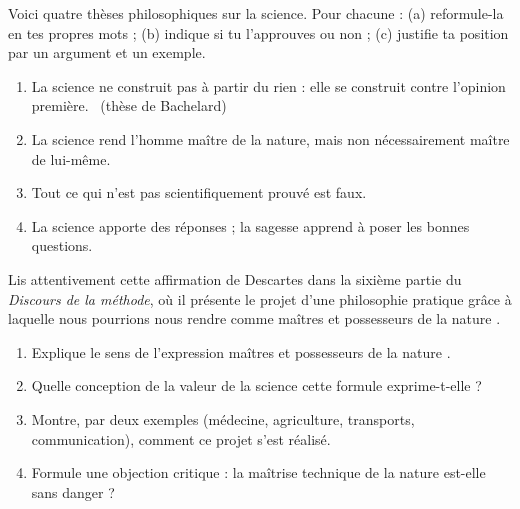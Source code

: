 \documentclass[11pt]{article}
\newcounter{popsec}
\newcounter{popsub}
\newcommand{\courssub}[1]{%
  \stepcounter{popsub}%
  \par\vspace{9pt}\noindent{\popxbold\fontsize{11.5}{13}\selectfont\color{popink}{\color{poporange}\thepopsec.\thepopsub}\hspace{6pt}#1}\par\nopagebreak\vspace{4pt}
}
\begin{document}
\courssub{Je m'entraîne}

\begin{exercice}
Voici quatre thèses philosophiques sur la science. Pour chacune : (a) reformule-la en tes propres mots ; (b) indique si tu l'approuves ou non ; (c) justifie ta position par un argument et un exemple.

\begin{enumerate}
\item \guillemotleft La science ne construit pas à partir du rien : elle se construit contre l'opinion première. \guillemotright\ (thèse de Bachelard)
\item La science rend l'homme maître de la nature, mais non nécessairement maître de lui-même.
\item Tout ce qui n'est pas scientifiquement prouvé est faux.
\item La science apporte des réponses ; la sagesse apprend à poser les bonnes questions.
\end{enumerate}
\end{exercice}

\begin{exercice}
Lis attentivement cette affirmation de Descartes dans la sixième partie du \emph{Discours de la méthode}, où il présente le projet d'une philosophie pratique grâce à laquelle nous pourrions nous rendre \guillemotleft comme maîtres et possesseurs de la nature \guillemotright.

\begin{enumerate}
\item Explique le sens de l'expression \guillemotleft maîtres et possesseurs de la nature \guillemotright.
\item Quelle conception de la valeur de la science cette formule exprime-t-elle ?
\item Montre, par deux exemples (médecine, agriculture, transports, communication), comment ce projet s'est réalisé.
\item Formule une objection critique : la maîtrise technique de la nature est-elle sans danger ?
\end{enumerate}
\end{exercice}
\end{document}
